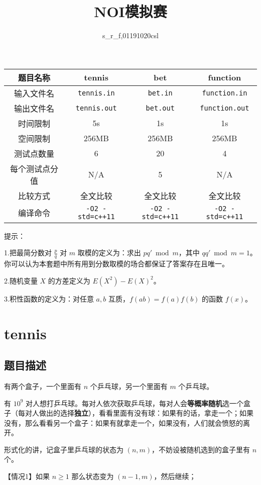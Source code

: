\documentclass[UTF8]{article}
\title{NOI模拟赛}
\author{s\_r\_f,01191020csl}
\begin{document}
\maketitle
\begin{tabular}{|c|c|c|c|}
	\hline
	题目名称 & tennis & bet & function\\
	\hline
	输入文件名 & \texttt{tennis.in} & \texttt{bet.in} & \texttt{function.in}\\
	\hline
	输出文件名 & \texttt{tennis.out} & \texttt{bet.out} & \texttt{function.out}\\
	\hline
	时间限制 & 5s & 1s & 1s\\
	\hline
	空间限制 & 256MB & 256MB & 256MB\\
	\hline
	测试点数量 & 6 & 20 & 4 \\
	\hline
	每个测试点分值 & N/A & 5 & N/A  \\
	\hline
	比较方式 & 全文比较 & 全文比较 & 全文比较 \\
	\hline
	编译命令 & \texttt{-O2 -std=c++11} & \texttt{-O2 -std=c++11} & \texttt{-O2 -std=c++11}  \\
	\hline
\end{tabular}

提示：

1.把最简分数对 $\frac pq$ 对 $m$ 取模的定义为：求出 $pq'\bmod m$，其中 $qq'\bmod m=1$。你可以认为本套题中所有用到分数取模的场合都保证了答案存在且唯一。

2.随机变量 $X$ 的方差定义为 $E(X^2)-E(X)^2$。

3.积性函数的定义为：对任意 $a,b$ 互质，$f(ab)=f(a)f(b)$ 的函数 $f(x)$。
\newpage
\section{tennis}
\subsection{题目描述}
有两个盒子，一个里面有 $n$ 个乒乓球，另一个里面有 $m$ 个乒乓球。

有 $10^9$ 对人想打乒乓球。每对人依次获取乒乓球，每对人会\textbf{等概率随机}选一个盒子（每对人做出的选择\textbf{独立}），看看里面有没有球：如果有的话，拿走一个；如果没有，那么看看另一个盒子：如果有就拿走一个，如果没有，人们就会愤怒的离开。

形式化的讲，记盒子里乒乓球的状态为 $(n,m)$，不妨设被随机选到的盒子里有 $n$ 个。

【情况1】如果 $n\geq 1$ 那么状态变为 $(n-1,m)$，然后继续；
\end{document}
